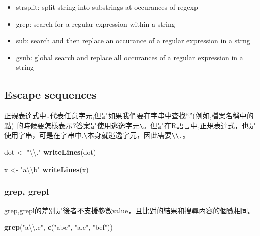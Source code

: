 \documentclass[]{book}
\newenvironment{Shaded}{\begin{snugshade}}{\end{snugshade}}
\newcommand{\CharTok}[1]{\textcolor[rgb]{0.31,0.60,0.02}{#1}}
\newcommand{\KeywordTok}[1]{\textcolor[rgb]{0.13,0.29,0.53}{\textbf{#1}}}
\newcommand{\NormalTok}[1]{#1}
\newcommand{\StringTok}[1]{\textcolor[rgb]{0.31,0.60,0.02}{#1}}
\providecommand{\tightlist}{%
  \setlength{\itemsep}{0pt}\setlength{\parskip}{0pt}}
\theoremstyle{definition}
\theoremstyle{definition}
\theoremstyle{definition}
\theoremstyle{remark}
\begin{document}
\begin{itemize}
\tightlist
\item
  strsplit: split string into substrings at occurances of regexp
\item
  grep: search for a regular expression within a string
\item
  sub: search and then replace an occurance of a regular expression in a
  strng
\item
  gsub: global search and replace all occurances of a regular expression
  in a string
\end{itemize}

\hypertarget{escape-sequences}{%
\subsection{Escape sequences}\label{escape-sequences}}

正規表達式中\texttt{.}代表任意字元,但是如果我們要在字串中查找``.''(例如,檔案名稱中的點)
的時候要怎樣表示?答案是使用逃逸字元\texttt{\textbackslash{}}。但是在R語言中,正規表達式，也是使用字串，可是在字串中,\texttt{\textbackslash{}}本身就逃逸字元，因此需要\texttt{\textbackslash{}\textbackslash{}.}。

\begin{Shaded}
\begin{Highlighting}[]
\NormalTok{dot <-}\StringTok{ "}\CharTok{\textbackslash{}\textbackslash{}}\StringTok{."}
\KeywordTok{writeLines}\NormalTok{(dot)}
\end{Highlighting}
\end{Shaded}

\begin{Shaded}
\begin{Highlighting}[]
\NormalTok{x <-}\StringTok{ "a}\CharTok{\textbackslash{}\textbackslash{}}\StringTok{b"}
\KeywordTok{writeLines}\NormalTok{(x)}
\end{Highlighting}
\end{Shaded}

\hypertarget{grep-grepl}{%
\subsubsection{grep, grepl}\label{grep-grepl}}

grep,grepl的差別是後者不支援參數value，且比對的結果和搜尋內容的個數相同。

\begin{Shaded}
\begin{Highlighting}[]
\KeywordTok{grep}\NormalTok{(}\StringTok{"a}\CharTok{\textbackslash{}\textbackslash{}}\StringTok{.c"}\NormalTok{, }\KeywordTok{c}\NormalTok{(}\StringTok{"abc"}\NormalTok{, }\StringTok{"a.c"}\NormalTok{, }\StringTok{"bef"}\NormalTok{))}
\end{Highlighting}
\end{Shaded}
\end{document}
